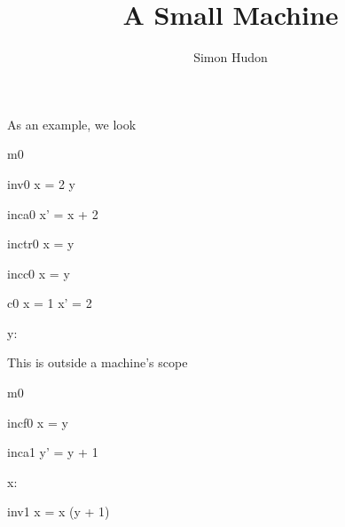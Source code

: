\documentclass[12pt]{amsart}
\title{A Small Machine}
\author{Simon Hudon}
\date{} %
\begin{document}
\maketitle

As an example, we look

\begin{machine}{m0}


\begin{invariant}{inv0}
	x = 2 \cdot y
\end{invariant}

\begin{evassignment}{inc}{a0}
	x' = x + 2
\end{evassignment}

\begin{transient}{inc}{tr0}
	x = y
\end{transient}

\begin{cschedule}{inc}{c0}
	x = y
\end{cschedule}

\begin{constraint}{c0}
	x = 1 \implies x' = 2
\end{constraint}

\begin{variable}
	y: \Int
\end{variable}

\end{machine}
This is outside a machine's scope

\begin{machine}{m0}

\begin{fschedule}{inc}{f0}
	x = y
\end{fschedule}

\begin{evassignment}{inc}{a1}
	y' = y + 1
\end{evassignment}

\begin{variable}
	x: \Int
\end{variable}

\begin{invariant}{inv1}
	x = x \cdot (y + 1)
\end{invariant}

\end{machine}
\end{document}
